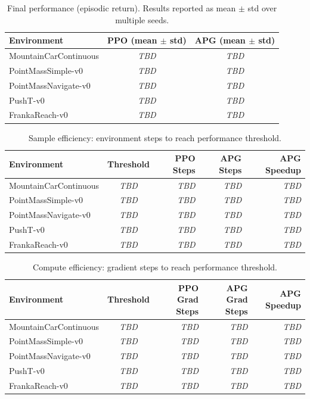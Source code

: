 \documentclass[11pt,a4paper]{article}
\newcommand{\tbd}{\textit{TBD}}
\begin{document}
\begin{table}[htbp]
  \centering
  \caption{Final performance (episodic return). Results reported as mean $\pm$ std over multiple seeds.}
  \label{tab:final_return}
  \begin{tabular}{@{}lcc@{}}
    \toprule
    \textbf{Environment} & \textbf{PPO (mean $\pm$ std)} & \textbf{APG (mean $\pm$ std)} \\
    \midrule
    MountainCarContinuous & \tbd & \tbd \\
    PointMassSimple-v0   & \tbd & \tbd \\
    PointMassNavigate-v0 & \tbd & \tbd \\
    PushT-v0             & \tbd & \tbd \\
    FrankaReach-v0       & \tbd & \tbd \\
    \bottomrule
  \end{tabular}
\end{table}

\begin{table}[htbp]
  \centering
  \caption{Sample efficiency: environment steps to reach performance threshold.}
  \label{tab:sample_eff}
  \begin{tabular}{@{}lcrrr@{}}
    \toprule
    \textbf{Environment} & \textbf{Threshold} & \textbf{PPO Steps} & \textbf{APG Steps} & \textbf{APG Speedup} \\
    \midrule
    MountainCarContinuous & \tbd & \tbd & \tbd & \tbd \\
    PointMassSimple-v0   & \tbd & \tbd & \tbd & \tbd \\
    PointMassNavigate-v0 & \tbd & \tbd & \tbd & \tbd \\
    PushT-v0             & \tbd & \tbd & \tbd & \tbd \\
    FrankaReach-v0       & \tbd & \tbd & \tbd & \tbd \\
    \bottomrule
  \end{tabular}
\end{table}

\begin{table}[htbp]
  \centering
  \caption{Compute efficiency: gradient steps to reach performance threshold.}
  \label{tab:grad_eff}
  \begin{tabular}{@{}lcrrr@{}}
    \toprule
    \textbf{Environment} & \textbf{Threshold} & \textbf{PPO Grad Steps} & \textbf{APG Grad Steps} & \textbf{APG Speedup} \\
    \midrule
    MountainCarContinuous & \tbd & \tbd & \tbd & \tbd \\
    PointMassSimple-v0   & \tbd & \tbd & \tbd & \tbd \\
    PointMassNavigate-v0 & \tbd & \tbd & \tbd & \tbd \\
    PushT-v0             & \tbd & \tbd & \tbd & \tbd \\
    FrankaReach-v0       & \tbd & \tbd & \tbd & \tbd \\
    \bottomrule
  \end{tabular}
\end{table}
\end{document}
